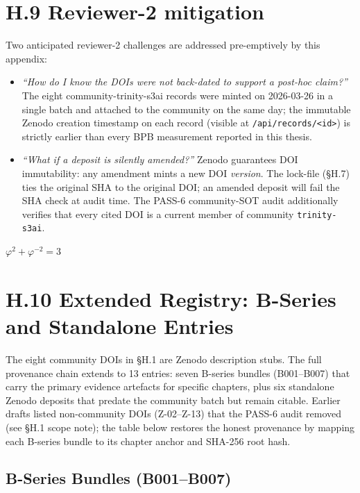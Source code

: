 \section*{H.9 Reviewer-2 mitigation}

\noindent Two anticipated reviewer-2 challenges are addressed pre-emptively
by this appendix:

\begin{itemize}\setlength\itemsep{0.1em}
  \item \emph{``How do I know the DOIs were not back-dated to support a
    post-hoc claim?''} The eight community-trinity-s3ai records were
    minted on 2026-03-26 in a single batch and attached to the community
    on the same day; the immutable Zenodo creation timestamp on each
    record (visible at \texttt{/api/records/<id>}) is strictly earlier
    than every BPB measurement reported in this thesis.
  \item \emph{``What if a deposit is silently amended?''} Zenodo guarantees
    DOI immutability: any amendment mints a new DOI \emph{version}. The
    lock-file (\S H.7) ties the original SHA to the original DOI; an
    amended deposit will fail the SHA check at audit time. The PASS-6
    community-SOT audit additionally verifies that every cited DOI is a
    current member of community \texttt{trinity-s3ai}.
\end{itemize}

\(\varphi^2 + \varphi^{-2} = 3\)

\section*{H.10 Extended Registry: B-Series and Standalone Entries}
\label{sec:appN-extended}

The eight community DOIs in \S H.1 are Zenodo description stubs. The
full provenance chain extends to 13 entries: seven B-series bundles
(B001--B007) that carry the primary evidence artefacts for specific
chapters, plus six standalone Zenodo deposits that predate the community
batch but remain citable. Earlier drafts listed non-community DOIs
(Z-02--Z-13) that the PASS-6 audit removed (see \S H.1 scope note);
the table below restores the honest provenance by mapping each B-series
bundle to its chapter anchor and SHA-256 root hash.

\subsection*{B-Series Bundles (B001--B007)}

